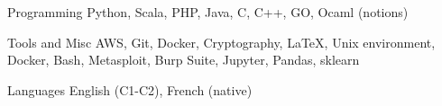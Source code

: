 


\begin{cvskills}
	
	
	\cvskill
	{Programming} %
	{Python, Scala, PHP, Java, C, C++, GO, Ocaml (notions)} %
	
	
	\cvskill
	{Tools and Misc} %
	{AWS, Git, Docker, Cryptography, \LaTeX, Unix environment, Docker, Bash, Metasploit, Burp Suite, Jupyter, Pandas, sklearn} %
	
	
	\cvskill
	{Languages} %
	{English (C1-C2), French (native)} %
	
	
\end{cvskills}